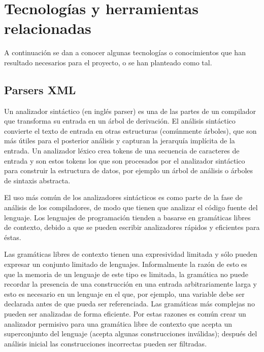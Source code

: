 %
%
%
%

\chapter{Tecnologías y herramientas relacionadas} \label{chap:estado}

A continuación se dan a conocer algunas tecnologías o conocimientos que han 
resultado necesarios para el proyecto, o se han planteado como tal.

\section{Parsers XML}

Un analizador sintáctico \cite{Wiki:2013:ANA} (en inglés parser) es una de las 
partes de un compilador que transforma su entrada en un árbol de derivación.
El análisis sintáctico convierte el texto de entrada en otras estructuras 
(comúnmente árboles), que son más útiles para el posterior análisis y capturan 
la jerarquía implícita de la entrada. Un analizador léxico crea tokens de una 
secuencia de caracteres de entrada y son estos tokens los que son procesados 
por el analizador sintáctico para construir la estructura de datos, por ejemplo 
un árbol de análisis o árboles de sintaxis abstracta.

El uso más común de los analizadores sintácticos es como parte de la fase de 
análisis de los compiladores, de modo que tienen que analizar el código fuente 
del lenguaje. Los lenguajes de programación tienden a basarse en gramáticas 
libres de contexto, debido a que se pueden escribir analizadores rápidos y 
eficientes para éstas.

Las gramáticas libres de contexto tienen una expresividad limitada y sólo pueden 
expresar un conjunto limitado de lenguajes. Informalmente la razón de esto es
que la memoria de un lenguaje de este tipo es limitada, la gramática no puede 
recordar la presencia de una construcción en una entrada arbitrariamente larga y
esto es necesario en un lenguaje en el que, por ejemplo, una variable debe ser
declarada antes de que pueda ser referenciada. Las gramáticas más complejas no 
pueden ser analizadas de forma eficiente. Por estas razones es común crear un 
analizador permisivo para una gramática libre de contexto que acepta un
superconjunto del lenguaje (acepta algunas construcciones inválidas); después
del análisis inicial las construcciones incorrectas pueden ser filtradas.

